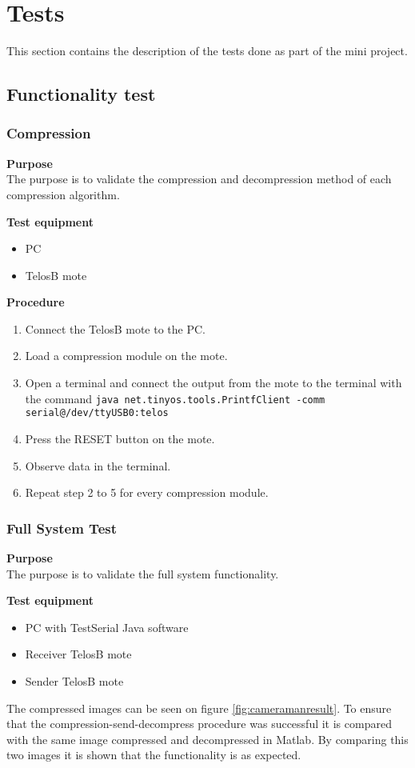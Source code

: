 \section{Tests}
This section contains the description of the tests done as part of the mini project.

\subsection{Functionality test}


\subsubsection{Compression}

\textbf{Purpose}\\
The purpose is to validate the compression and decompression method of each compression algorithm.

\textbf{Test equipment}
\begin{itemize}
\item PC 
\item TelosB mote
\end{itemize}

\textbf{Procedure}
\begin{enumerate}
\item Connect the TelosB mote to the PC.
\item Load a compression module on the mote.
\item Open a terminal and connect the output from the mote to the terminal with the command \texttt{java net.tinyos.tools.PrintfClient -comm serial@/dev/ttyUSB0:telos}
\item Press the RESET button on the mote.
\item Observe data in the terminal.
\item Repeat step 2 to 5 for every compression module.
\end{enumerate}

\subsubsection{Full System Test}
\textbf{Purpose}\\
The purpose is to validate the full system functionality.

\textbf{Test equipment}
\begin{itemize}
\item PC with TestSerial Java software
\item Receiver TelosB mote
\item Sender TelosB mote
\end{itemize}
The compressed images can be seen on figure \ref{fig:cameramanresult}. 
To ensure that the compression-send-decompress procedure was successful it is compared with the same image compressed and decompressed in Matlab. 
By comparing this two images it is shown that the functionality is as expected. 

